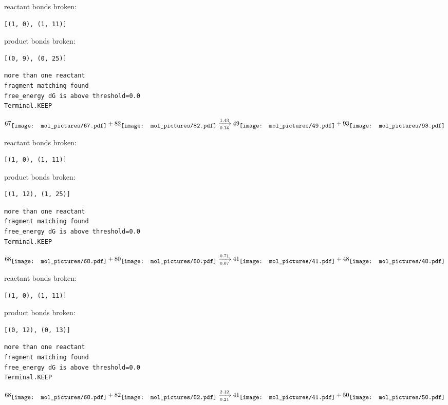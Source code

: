 \documentclass{article}
\begin{document}
reactant bonds broken:\begin{verbatim}
[(1, 0), (1, 11)]
\end{verbatim}
product bonds broken:\begin{verbatim}
[(0, 9), (0, 25)]
\end{verbatim}




\vspace{1cm}
\begin{verbatim}
more than one reactant
fragment matching found
free_energy dG is above threshold=0.0
Terminal.KEEP
\end{verbatim}
$$
67
\raisebox{-.5\height}{\texttt{[image: mol\_pictures/67.pdf]}}
+
82
\raisebox{-.5\height}{\texttt{[image: mol\_pictures/82.pdf]}}
\xrightarrow[0.14]{1.43}
49
\raisebox{-.5\height}{\texttt{[image: mol\_pictures/49.pdf]}}
+
93
\raisebox{-.5\height}{\texttt{[image: mol\_pictures/93.pdf]}}
$$


reactant bonds broken:\begin{verbatim}
[(1, 0), (1, 11)]
\end{verbatim}
product bonds broken:\begin{verbatim}
[(1, 12), (1, 25)]
\end{verbatim}




\vspace{1cm}
\begin{verbatim}
more than one reactant
fragment matching found
free_energy dG is above threshold=0.0
Terminal.KEEP
\end{verbatim}
$$
68
\raisebox{-.5\height}{\texttt{[image: mol\_pictures/68.pdf]}}
+
80
\raisebox{-.5\height}{\texttt{[image: mol\_pictures/80.pdf]}}
\xrightarrow[0.07]{0.71}
41
\raisebox{-.5\height}{\texttt{[image: mol\_pictures/41.pdf]}}
+
48
\raisebox{-.5\height}{\texttt{[image: mol\_pictures/48.pdf]}}
$$


reactant bonds broken:\begin{verbatim}
[(1, 0), (1, 11)]
\end{verbatim}
product bonds broken:\begin{verbatim}
[(0, 12), (0, 13)]
\end{verbatim}




\vspace{1cm}
\begin{verbatim}
more than one reactant
fragment matching found
free_energy dG is above threshold=0.0
Terminal.KEEP
\end{verbatim}
$$
68
\raisebox{-.5\height}{\texttt{[image: mol\_pictures/68.pdf]}}
+
82
\raisebox{-.5\height}{\texttt{[image: mol\_pictures/82.pdf]}}
\xrightarrow[0.21]{2.12}
41
\raisebox{-.5\height}{\texttt{[image: mol\_pictures/41.pdf]}}
+
50
\raisebox{-.5\height}{\texttt{[image: mol\_pictures/50.pdf]}}
$$
\end{document}
